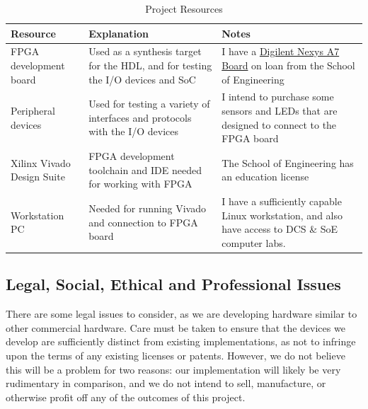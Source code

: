 \documentclass[a4paper,fleqn,12pt]{article}
\begin{document}
\begin{table}[h!]
    \centering
    \begin{tabular}{|p{}|p{}|p{}|}
        \hline
        \textbf{Resource}          & \textbf{Explanation}                                                            & \textbf{Notes}                                                                                                                                   \\ \hline
        FPGA development board     & Used as a synthesis target for the HDL, and for testing the I/O devices and SoC & I have a \href{https://digilent.com/reference/programmable-logic/nexys-a7/start}{Digilent Nexys A7 Board} on loan from the School of Engineering \\ \hline
        Peripheral devices         & Used for testing a variety of interfaces and protocols with the I/O devices     & I intend to purchase some sensors and LEDs that are designed to connect to the FPGA board                                                        \\ \hline
        Xilinx Vivado Design Suite & FPGA development toolchain and IDE needed for working with FPGA                 & The School of Engineering has an education license                                                                                               \\ \hline
        Workstation PC             & Needed for running Vivado and connection to FPGA board                          & I have a sufficiently capable Linux workstation, and also have access to DCS \& SoE computer labs.                                               \\ \hline
    \end{tabular}
    \caption{Project Resources}
    \label{tab:resources}
\end{table}


\subsection{Legal, Social, Ethical and Professional Issues}

There are some legal issues to consider, as we are developing hardware similar to other commercial hardware. Care must be taken to ensure that the devices we develop are sufficiently distinct from existing implementations, as not to infringe upon the terms of any existing licenses or patents. However, we do not believe this will be a problem for two reasons: our implementation will likely be very rudimentary in comparison, and we do not intend to sell, manufacture, or otherwise profit off any of the outcomes of this project.
\end{document}

